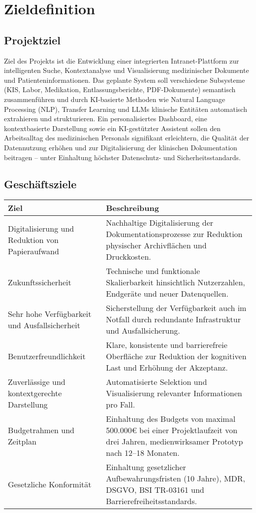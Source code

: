 {\let\clearpage\relax
\chapter{Zieldefinition}}
\label{sec:zieldefinition}
\section{Projektziel}

Ziel des Projekts ist die Entwicklung einer integrierten Intranet-Plattform zur intelligenten Suche, Kontextanalyse und Visualisierung medizinischer Dokumente und Patienteninformationen. Das geplante System soll verschiedene Subsysteme (KIS, Labor, Medikation, Entlassungsberichte, PDF-Dokumente) semantisch zusammenführen und durch KI-basierte Methoden wie Natural Language Processing (NLP), Transfer Learning und LLMs klinische Entitäten automatisch extrahieren und strukturieren.
Ein personalisiertes Dashboard, eine kontextbasierte Darstellung sowie ein KI-gestützter Assistent sollen den Arbeitsalltag des medizinischen Personals signifikant erleichtern, die Qualität der Datennutzung erhöhen und zur Digitalisierung der klinischen Dokumentation beitragen – unter Einhaltung höchster Datenschutz- und Sicherheitsstandards.
\section{Geschäftsziele}

\begin{center}
\begin{tabular}{|p{5cm}|p{10cm}|}
	\hline
	\textbf{Ziel} & \textbf{Beschreibung} \\
	\hline
	Digitalisierung und Reduktion von Papieraufwand & Nachhaltige Digitalisierung der Dokumentationsprozesse zur Reduktion physischer Archivflächen und Druckkosten. \\
	\hline
	Zukunftssicherheit & Technische und funktionale Skalierbarkeit hinsichtlich Nutzerzahlen, Endgeräte und neuer Datenquellen. \\
	\hline
	Sehr hohe Verfügbarkeit und Ausfallsicherheit & Sicherstellung der Verfügbarkeit auch im Notfall durch redundante Infrastruktur und Ausfallsicherung. \\
	\hline
	Benutzerfreundlichkeit & Klare, konsistente und barrierefreie Oberfläche zur Reduktion der kognitiven Last und Erhöhung der Akzeptanz. \\
	\hline
	Zuverlässige und kontextgerechte Darstellung & Automatisierte Selektion und Visualisierung relevanter Informationen pro Fall. \\
	\hline
	Budgetrahmen und Zeitplan & Einhaltung des Budgets von maximal 500.000€ bei einer Projektlaufzeit von drei Jahren, medienwirksamer Prototyp nach 12–18 Monaten. \\
	\hline
	Gesetzliche Konformität & Einhaltung gesetzlicher Aufbewahrungsfristen (10 Jahre), MDR, DSGVO, BSI TR-03161 und Barrierefreiheitsstandards. \\
	\hline
\end{tabular}
\end{center}



